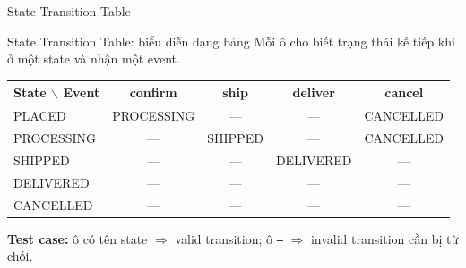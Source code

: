 \documentclass[aspectratio=169,12pt]{beamer}
\begin{document}
\begin{frame}[shrink=6]{State Transition Table}
  \begin{block}{State Transition Table: biểu diễn dạng bảng}
    Mỗi ô cho biết trạng thái kế tiếp khi ở một state và nhận một event.
  \end{block}

  \vspace{0.1em}
  \begin{center}
  \small
  \setlength{\tabcolsep}{6pt}
  \begin{tabular}{lcccc}
    \toprule
    \textbf{State} $\backslash$ \textbf{Event}
      & confirm & ship & deliver & cancel \\
    \midrule
    PLACED     & PROCESSING & ---     & ---       & CANCELLED \\
    PROCESSING & ---        & SHIPPED & ---       & CANCELLED \\
    SHIPPED    & ---        & ---     & DELIVERED & --- \\
    DELIVERED  & ---        & ---     & ---       & --- \\
    CANCELLED  & ---        & ---     & ---       & --- \\
    \bottomrule
  \end{tabular}
  \end{center}

  \vspace{0.05em}
  {\small \textbf{Test case:} ô có tên state $\Rightarrow$ valid transition; ô \texttt{---} $\Rightarrow$ invalid transition cần bị từ chối.}
\end{frame}
\end{document}
